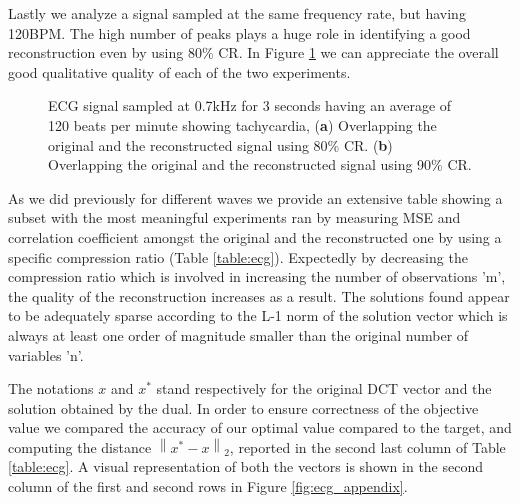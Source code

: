 \documentclass[journal,article,submit,electronics,pdftex]{Definitions/mdpi}
\newcommand{\norm}[1]{\left\lVert#1\right\rVert}
\begin{document}
{Lastly we analyze a signal sampled at the same frequency rate, but having 120BPM. The high number of peaks plays a huge role in identifying a good reconstruction even by using 80\% CR. In Figure \ref{fig:tachycardia} we can appreciate the overall good qualitative quality of each of the two experiments.

\begin{figure}[H]
\centering
\hspace*{\fill}
%
\hspace*{\fill}
%
\hspace*{\fill}
\caption{ECG signal sampled at 0.7kHz for 3 seconds having an average of 120 beats per minute showing tachycardia, (\textbf{a}) Overlapping the original and the reconstructed signal using 80\% CR. 
(\textbf{b}) Overlapping the original and the reconstructed signal using 90\% CR.}
\label{fig:tachycardia}
\end{figure}

As we did previously for different waves we provide an extensive table showing a subset with the most meaningful experiments ran by measuring MSE and correlation coefficient amongst the original and the reconstructed one by using a specific compression ratio (Table \ref{table:ecg}). Expectedly by decreasing the compression ratio which is involved in increasing the number of observations 'm', the quality of the reconstruction increases as a result. The solutions found appear to be adequately sparse according to the L-1 norm of the solution vector which is always at least one order of magnitude smaller than the original number of variables 'n'.

The notations $x$ and $x^*$ stand respectively for the original DCT vector and the solution obtained by the dual. In order to ensure correctness of the objective value we compared the accuracy of our optimal value compared to the target, and computing the distance $\norm {x^* - x}_2$, reported in the second last column of Table \ref{table:ecg}. A visual representation of both the vectors is shown in the second column of the first and second rows in Figure \ref{fig:ecg_appendix}.


}
\end{document}
